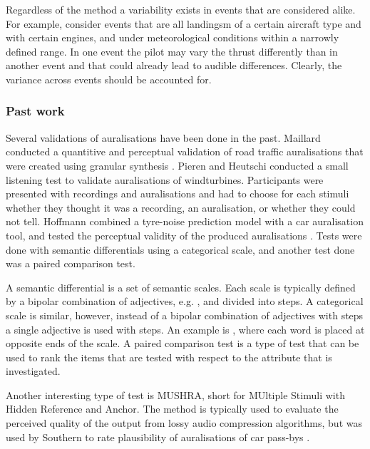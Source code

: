 Regardless of the method a variability exists in events that are considered
alike. For example, consider events that are all landingsm of a certain aircraft
type and with certain engines, and under meteorological conditions within a narrowly
defined range. In one event the pilot may vary the thrust differently than in
another event and that could already lead to audible differences.
Clearly, the variance across events should be accounted for.

\subsubsection*{Past work}
Several validations of auralisations have been done in the past. Maillard
conducted a quantitive and perceptual validation of road traffic auralisations
that were created using granular synthesis \cite{Maillard2014}. Pieren and
Heutschi conducted a small listening test to validate auralisations of
windturbines. Participants were presented with recordings and auralisations and
had to choose for each stimuli whether they thought it was a recording, an
auralisation, or whether they could not tell. Hoffmann combined a tyre-noise
prediction model with a car auralisation tool, and tested the perceptual
validity of the produced auralisations \cite{Hoffmann2016a,Hoffmann2016}. Tests
were done with semantic differentials using a categorical scale, and another
test done was a paired comparison test.

A semantic differential is a set of semantic scales. Each scale is typically
defined by a bipolar combination of adjectives, e.g. , and
divided into steps. A categorical scale is similar, however, instead of a
bipolar combination of adjectives with steps a single adjective is used with
steps. An example is , where each word is placed at opposite
ends of the scale. A paired comparison test is a type of test that can be used
to rank the items that are tested with respect to the attribute that is
investigated.

Another interesting type of test is MUSHRA, short for MUltiple Stimuli with
Hidden Reference and Anchor. The method is typically used to evaluate the
perceived quality of the output from lossy audio compression algorithms, but was
used by Southern to rate plausibility of auralisations of car pass-bys
\cite{Southern2016}.

